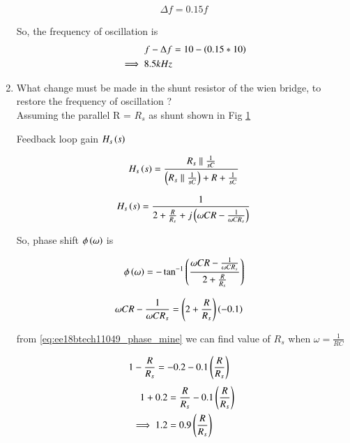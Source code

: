 \begin{enumerate}[label=\arabic*.,ref=\theenumi]
\begin{align}
\label{eq:ee18btech11049_freq}
    \Delta f = 0.15f
\end{align}

%
So, the frequency of oscillation is 
\begin{align}
\label{eq:ee18btech11049_freq}
    f - \Delta f &= 10-\brak{0.15*10}\\ 
    \implies 8.5 kHz
\end{align}

\item What change must be made in the shunt resistor of the wien bridge, to restore the frequency of oscillation ? \\
\solution Assuming the parallel R = $R_s$ as shunt shown in Fig \ref{fig:ee18btech11049_fig2}

\begin{figure}[!ht]
	\begin{center}
		\resizebox{\columnwidth}{!}{}
	\end{center}
\caption{}
\label{fig:ee18btech11049_fig2}
\end{figure}

Feedback loop gain $H_s\left(s\right)$

\begin{align}
\label{eq:ee18btech11049_beta}
    H_s\brak{s} = \frac{R_s \parallel \frac{1}{sC}}{\brak{R_s \parallel \frac{1}{sC}} + R + \frac{1}{sC}}
\end{align}

\begin{align}
\label{eq:ee18btech11049_freq}
    H_s\brak{s} = \frac{1}{2 + \frac{R}{R_s} + j\brak{\omega CR - \frac{1}{\omega CR_s}}}
\end{align}

So, phase shift $\phi\left(\omega\right)$ is

\begin{align}
\label{eq:ee18btech11049_phase_mine}
    \phi\brak{\omega}  = -\tan^{-1}\brak{\frac{\omega CR - \frac{1}{\omega CR_s}}{2+\frac{R}{R_s}}}
\end{align}


\begin{align}
    \omega CR - \frac{1}{\omega CR_s} &= \left(2+\frac{R}{R_s}\right) \left(-0.1\right)
\end{align}

from \ref{eq:ee18btech11049_phase_mine} we can find value of $R_s$ when $\omega = \frac{1}{RC}$ 

\begin{align}
   1- \frac{R}{R_s} &= -0.2 - 0.1\left(\frac{R}{R_s}\right) 
\end{align}
\begin{align}
   1 + 0.2  &= \frac{R}{R_s} - 0.1\left(\frac{R}{R_s}\right)  \\
   \implies 1.2 &= 0.9 \left(\frac{R}{R_s}\right)
\end{align}


\end{enumerate}
